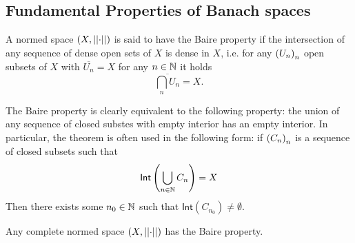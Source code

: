 \documentclass{article}
\begin{document}
\subsection{Fundamental Properties of Banach spaces}
\begin{definition}
	A normed space $\left(X,\left|\left|\cdot\right|\right|\right)$ is said to have the Baire property if the intersection of any sequence of dense open sets of $X$ is dense in $X$, i.e. for any ${\left({U}_{n}\right)}_{n}$ open subsets of $X$ with $\overline{U_{n}}=X$ for any $n\in\mathbb{N}$ it holds
	\begin{equation*}
		\overline{\bigcap_{n}U_{n}}=X.
	\end{equation*}
\end{definition}
The Baire property is clearly equivalent to the following property: the union of any sequence of closed substes with empty interior has an empty interior. In particular, the theorem is often used in the following form: if ${\left({C}_{n}\right)}_{n}$ is a sequence of closed subsets such that 
\begin{equation*}
	\mathsf{Int}\left(\bigcup_{n\in\mathbb{N}}C_{n}\right)=X
\end{equation*}
Then there exists some $n_{0}\in\mathbb{N}$ such that $\mathsf{Int}(C_{n_{0}})\neq\emptyset$.
\begin{theorem}
	Any complete normed space $\left(X,\left|\left|\cdot\right|\right|\right)$ has the Baire property.
\end{theorem}
\end{document}
